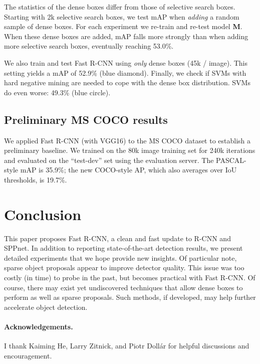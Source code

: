 \documentclass[10pt,twocolumn,letterpaper]{article}
\newcommand{\vggsixteen}{VGG16\xspace}
\newcommand{\Med}{{\bf M}\xspace}
\begin{document}
The statistics of the dense boxes differ from those of selective search boxes.
Starting with 2k selective search boxes, we test mAP when \emph{adding} a random sample of  dense boxes.
For each experiment we re-train and re-test model \Med.
When these dense boxes are added, mAP falls more strongly than when adding more selective search boxes, eventually reaching 53.0\%.

We also train and test Fast R-CNN using \emph{only} dense boxes (45k / image).
This setting yields a mAP of 52.9\% (blue diamond).
Finally, we check if SVMs with hard negative mining are needed to cope with the dense box distribution.
SVMs do even worse: 49.3\% (blue circle).



\subsection{Preliminary MS COCO results}
We applied Fast R-CNN (with \vggsixteen) to the MS COCO dataset \cite{coco} to establish a preliminary baseline.
We trained on the 80k image training set for 240k iterations and evaluated on the ``test-dev'' set using the evaluation server.
The PASCAL-style mAP is 35.9\%; the new COCO-style AP, which also averages over IoU thresholds, is 19.7\%.
 \section{Conclusion}

This paper proposes Fast R-CNN, a clean and fast update to R-CNN and SPPnet.
In addition to reporting state-of-the-art detection results, we present detailed experiments that we hope provide new insights.
Of particular note, sparse object proposals appear to improve detector quality.
This issue was too costly (in time) to probe in the past, but becomes practical with Fast R-CNN.
Of course, there may exist yet undiscovered techniques that allow dense boxes to perform as well as sparse proposals.
Such methods, if developed, may help further accelerate object detection.
 
\paragraph{Acknowledgements.}
I thank Kaiming He, Larry Zitnick, and Piotr Doll{\'a}r for helpful discussions and encouragement.

{\small


}
\end{document}
